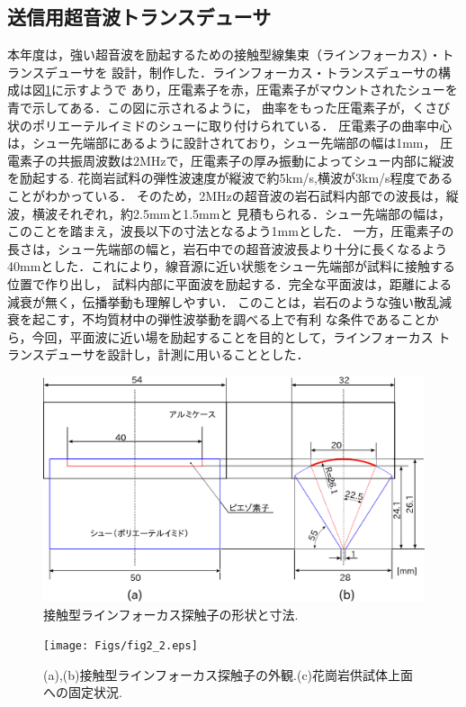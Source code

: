 \subsection{送信用超音波トランスデューサ}
本年度は，強い超音波を励起するための接触型線集束（ラインフォーカス）・トランスデューサを
設計，制作した．ラインフォーカス・トランスデューサの構成は図\ref{fig:fig2}に示すようで
あり，圧電素子を赤，圧電素子がマウントされたシューを青で示してある．この図に示されるように，
曲率をもった圧電素子が，くさび状のポリエーテルイミドのシューに取り付けられている．
圧電素子の曲率中心は，シュー先端部にあるように設計されており，シュー先端部の幅は1mm，
圧電素子の共振周波数は2MHzで，圧電素子の厚み振動によってシュー内部に縦波を励起する.
花崗岩試料の弾性波速度が縦波で約5km/s,横波が3km/s程度であることがわかっている．
そのため，2MHzの超音波の岩石試料内部での波長は，縦波，横波それぞれ，約2.5mmと1.5mmと
見積もられる．シュー先端部の幅は，このことを踏まえ，波長以下の寸法となるよう1mmとした．
一方，圧電素子の長さは，シュー先端部の幅と，岩石中での超音波波長より十分に長くなるよう
40mmとした．これにより，線音源に近い状態をシュー先端部が試料に接触する位置で作り出し，
試料内部に平面波を励起する．完全な平面波は，距離による減衰が無く，伝播挙動も理解しやすい．
このことは，岩石のような強い散乱減衰を起こす，不均質材中の弾性波挙動を調べる上で有利
な条件であることから，今回，平面波に近い場を励起することを目的として，ラインフォーカス
トランスデューサを設計し，計測に用いることとした．
\begin{figure}[h]
	\begin{center}
	\includegraphics[width=0.8\linewidth]{Figs/fig2.eps} 
	\end{center}
	\caption{
		接触型ラインフォーカス探触子の形状と寸法.
	} 
	\label{fig:fig2}
\end{figure}
\begin{figure}[h]
	\begin{center}
	\texttt{[image: Figs/fig2\_2.eps]} 
	\end{center}
	\caption{
		(a),(b)接触型ラインフォーカス探触子の外観.(c)花崗岩供試体上面への固定状況.
	} 
	\label{fig:fig2_2}
\end{figure}
